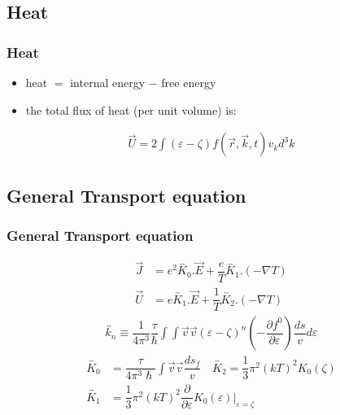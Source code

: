 \documentclass{beamer}
\begin{document}
\subsection{Heat}
\begin{frame}
\frametitle{Heat}
\begin{itemize}
\item heat $=$ internal energy $-$ free energy
\pause
\item the total flux of heat (per unit volume) is:
\end{itemize}
\begin{align*}
\vec{U} = 2 \int  (\varepsilon - \zeta)f(\vec{r},\vec{k},t) v_k d^3k
\end{align*}
\end{frame}
\subsection{General Transport equation}
\begin{frame}
\frametitle{General Transport equation}
\begin{align*}
\vec{J} &= e^2 \overleftrightarrow{K_0}.\vec{E} +\dfrac{e}{T} \overleftrightarrow{K_1} . (- \nabla T)\\
\vec{U} &= e \overleftrightarrow{K_1}.\vec{E} +\dfrac{1}{T} \overleftrightarrow{K_2} . (- \nabla T)
\end{align*}
\pause
\begin{align*}
\overleftrightarrow{k_n} \equiv \dfrac{1}{4 \pi ^3} \dfrac{\tau}{\hslash} \int \int \vec{v} \vec{v} (\varepsilon - \zeta)^n (- \dfrac{\partial f^0}{\partial \varepsilon}) \dfrac{ds}{v} d\varepsilon
\end{align*}
\pause
\begin{align*}
\overleftrightarrow{K_0} &= \dfrac{\tau}{4\pi^3 \hslash} \int \vec{v}\vec{v} \dfrac{ds_f}{v} \quad
\overleftrightarrow{K_2} = \dfrac{1}{3}\pi^2 (kT)^2 K_0 (\zeta)\\
\overleftrightarrow{K_1} &= \dfrac{1}{3}\pi^2 (kT)^2 \dfrac{\partial}{\partial \varepsilon} K_0 (\varepsilon) \big| _{\varepsilon = \zeta} 
\end{align*}
\end{frame}
\end{document}
